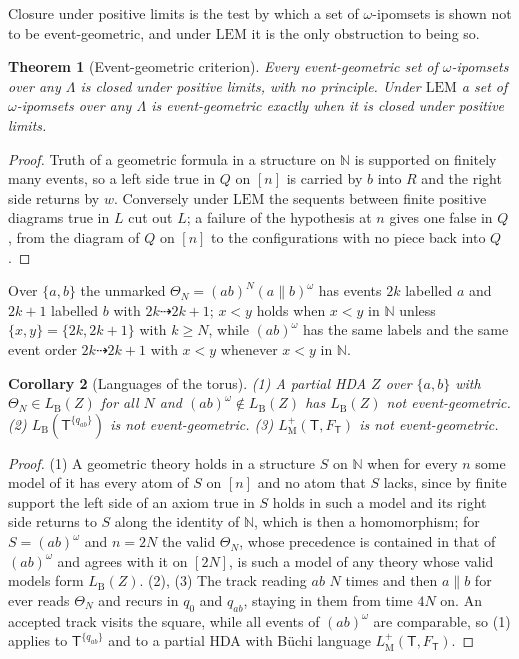 \documentclass{lmcs}
\newtheorem{theorem}{Theorem}[section]
\newtheorem{corollary}[theorem]{Corollary}
\theoremstyle{definition}
\theoremstyle{remark}
\newcommand{\Nn}{\mathbb{N}}
\newcommand{\ab}{\{a,b\}}
\newcommand{\prin}[1]{\mathrm{#1}}
\newcommand{\EM}{\prin{LEM}}
\providecommand{\LB}[1]{L_{\mathrm{B}}(#1)}
\providecommand{\LMp}[1]{L^{+}_{\mathrm{M}}(#1)}
\providecommand{\FT}{F_{\mathsf{T}}}
\begin{document}
Closure under positive limits is the test by which a set of $\omega$-ipomsets is shown not to be event-geometric,
and under $\EM$ it is the only obstruction to being so.

\begin{theorem}[Event-geometric criterion]\label{thm:muller-eg}\label{prop:muller-events}
Every event-geometric set of $\omega$-ipomsets over any $\Lambda$ is closed under positive limits, with no
principle. Under $\EM$ a set of $\omega$-ipomsets over any $\Lambda$ is
event-geometric exactly when it is closed under positive limits.
\end{theorem}

\begin{proof}
Truth of a geometric formula in a structure on $\Nn$ is supported on finitely many
events, so a left side true in $Q$ on $[n]$ is carried by $b$ into $R$ and the right side
returns by $w$.
Conversely under $\EM$ the sequents between finite positive diagrams true in $L$ cut out $L$; a failure of the
hypothesis at $n$ gives one false in $Q$, from the diagram of $Q$ on $[n]$ to the configurations with no piece back
into $Q$.
\end{proof}

Over $\ab$ the unmarked $\Theta_N=(ab)^N(a\parallel b)^\omega$ has events $2k$ labelled $a$ and $2k+1$ labelled $b$ with
$2k\dashrightarrow 2k+1$; $x<y$ holds when $x<y$ in $\Nn$ unless $\{x,y\}=\{2k,2k+1\}$ with $k\geq N$, while
$(ab)^\omega$ has the same labels and the same event order $2k\dashrightarrow 2k+1$ with $x<y$ whenever $x<y$ in
$\Nn$.

\begin{corollary}[Languages of the torus]\label{cor:muller-events}
(1) A partial HDA $Z$ over $\ab$ with $\Theta_N\in\LB{Z}$ for all $N$ and $(ab)^\omega\notin\LB{Z}$ has $\LB{Z}$
not event-geometric.
(2) $\LB{\mathsf{T}^{\{q_{ab}\}}}$ is not event-geometric.
(3) $\LMp{\mathsf{T},\FT}$ is not event-geometric.
\end{corollary}

\begin{proof}
(1) A geometric theory holds in a structure $S$ on $\Nn$ when for every $n$ some model of it has every atom of $S$
on $[n]$ and no atom that $S$ lacks, since by finite support the left side of an axiom true in $S$ holds in such a model
and its right side returns to $S$ along the identity of $\Nn$, which is then a
homomorphism; for $S=(ab)^\omega$ and $n=2N$ the valid $\Theta_N$,
whose precedence is contained in that of $(ab)^\omega$ and agrees with it on $[2N]$, is such a
model of any theory whose valid models form
$\LB{Z}$.
(2), (3) The track reading $ab$ $N$ times and then $a\parallel b$ for ever reads $\Theta_N$ and recurs in $q_0$ and $q_{ab}$, staying
in them from time $4N$ on. An
accepted track visits the square, while all events of $(ab)^\omega$ are comparable, so (1) applies to $\mathsf{T}^{\{q_{ab}\}}$
and to a partial HDA with B\"uchi language $\LMp{\mathsf{T},\FT}$.
\end{proof}
\end{document}
